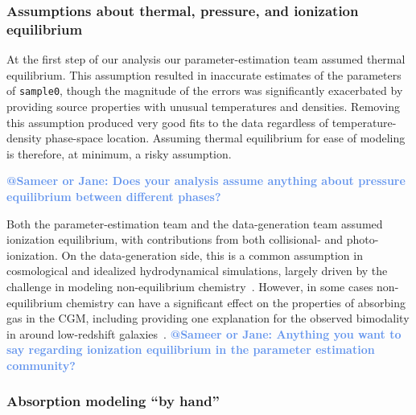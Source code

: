 \documentclass[fleqn,usenatbib]{mnras}
\makeatletter
\newcommand{\atsameer}[1]{\textcolor{CornflowerBlue}{\textbf{@Sameer or Jane: #1}}}
\makeatother
\begin{document}
\subsubsection{Assumptions about thermal, pressure, and ionization equilibrium}

At the first step of our analysis our parameter-estimation team assumed thermal equilibrium.
This assumption resulted in inaccurate estimates of the parameters of \texttt{sample0}, though the magnitude of the errors was significantly exacerbated by providing source properties with unusual temperatures and densities.
Removing this assumption produced very good fits to the data regardless of temperature-density phase-space location.
Assuming thermal equilibrium for ease of modeling is therefore, at minimum, a risky assumption.

\atsameer{Does your analysis assume anything about pressure equilibrium between different phases?}

Both the parameter-estimation team and the data-generation team assumed ionization equilibrium, with contributions from both collisional- and photo-ionization.
On the data-generation side, this is a common assumption in cosmological and idealized hydrodynamical simulations, largely driven by the challenge in modeling non-equilibrium chemistry~\citep[e.g.][]{richings2014Nonequilibrium}.
However, in some cases non-equilibrium chemistry can have a significant effect on the properties of absorbing gas in the CGM, including providing one explanation for the observed bimodality in  around low-redshift galaxies~\citep{oppenheimer2016Bimodality}.
\atsameer{Anything you want to say regarding ionization equilibrium in the parameter estimation community?}

\subsubsection{Absorption modeling ``by hand''}
\end{document}
